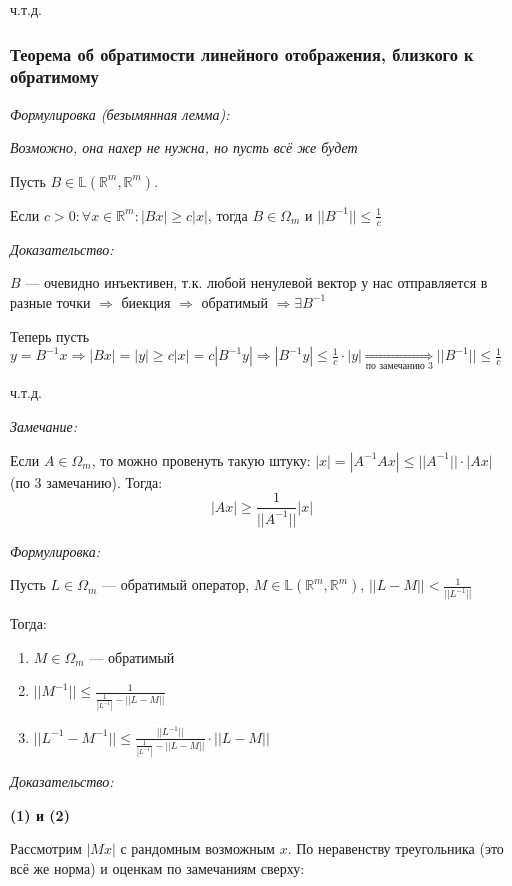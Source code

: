 \documentclass{article}
\begin{document}
ч.т.д.



\subsubsection{Теорема об обратимости линейного отображения, близкого к обратимому}
\textit{Формулировка (безымянная лемма):}

\textit{Возможно, она нахер не нужна, но пусть всё же будет}

Пусть $B \in \mathbb{L}(\mathbb{R}^m, \mathbb{R}^m)$.

Если $c > 0: \forall x \in \mathbb{R}^m: |Bx| \ge c|x|$, тогда $B \in \Omega_m$ и $||B^{-1}|| \le \frac{1}{c}$

\textit{Доказательство:}

$B$ --- очевидно инъективен, т.к. любой ненулевой вектор у нас отправляется в разные точки $\Rightarrow$ биекция $\Rightarrow$ обратимый $\Rightarrow \exists B^{-1}$

Теперь пусть $y = B^{-1}x \Rightarrow |Bx| = |y| \ge c|x| = c |B^{-1}y| \Rightarrow |B^{-1}y| \le \frac{1}{c} \cdot |y| \underset{\text{по замечанию 3}}{\Rightarrow} ||B^{-1}|| \le \frac{1}{c}$

ч.т.д.

\textit{Замечание:}

Если $A \in \Omega_m$, то можно провенуть такую штуку: $|x| = |A^{-1}Ax| \le ||A^{-1}||\cdot|Ax|$ (по 3 замечанию). Тогда:
\[|Ax|\ge \frac{1}{||A^{-1}||} |x|\]

\textit{Формулировка:}

Пусть $L \in \Omega_m$ --- обратимый оператор, $M \in \mathbb{L}(\mathbb{R}^m, \mathbb{R}^m)$, $||L - M|| < \frac{1}{||L^{-1}||}$

Тогда: \begin{enumerate}
    \item $M \in \Omega_{m}$ --- обратимый
    \item $||M^{-1}|| \le \frac{1}{\frac{1}{|L^{-1}|} - ||L - M||}$
    \item $||L^{-1} - M^{-1}|| \le \frac{||L^{-1}||}{\frac{1}{|L^{-1}|} - ||L - M||} \cdot ||L - M||$
\end{enumerate}

\textit{Доказательство:}

\textbf{(1) и (2)}

Рассмотрим $|Mx|$ с рандомным возможным $x$. По неравенству треугольника (это всё же норма) и оценкам по замечаниям сверху:
\end{document}
